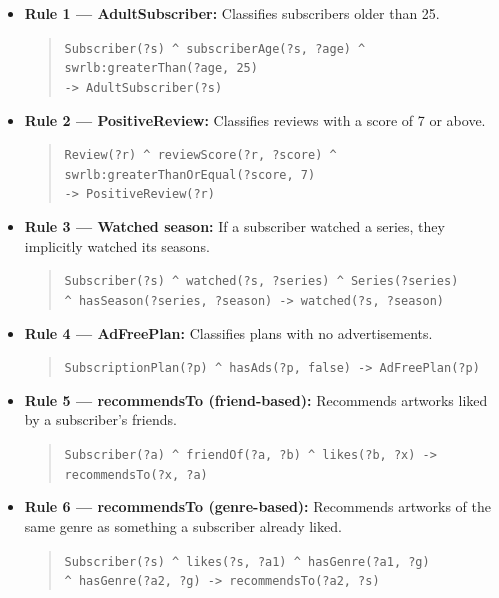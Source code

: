 \begin{itemize}

    \item \textbf{Rule 1 — AdultSubscriber:} Classifies subscribers older than 25.
    \begin{quote}\small
    \texttt{Subscriber(?s) \^{} subscriberAge(?s, ?age) \^{} swrlb:greaterThan(?age, 25)}\\
    \texttt{-> AdultSubscriber(?s)}
    \end{quote}

    \item \textbf{Rule 2 — PositiveReview:} Classifies reviews with a score of 7 or above.
    \begin{quote}\small
    \texttt{Review(?r) \^{} reviewScore(?r, ?score) \^{} swrlb:greaterThanOrEqual(?score, 7)}\\
    \texttt{-> PositiveReview(?r)}
    \end{quote}

    \item \textbf{Rule 3 — Watched season:} If a subscriber watched a series, they implicitly watched its seasons.
    \begin{quote}\small
    \texttt{Subscriber(?s) \^{} watched(?s, ?series) \^{} Series(?series)}\\
    \texttt{\^{} hasSeason(?series, ?season) -> watched(?s, ?season)}
    \end{quote}

    \item \textbf{Rule 4 — AdFreePlan:} Classifies plans with no advertisements.
    \begin{quote}\small
    \texttt{SubscriptionPlan(?p) \^{} hasAds(?p, false) -> AdFreePlan(?p)}
    \end{quote}

    \item \textbf{Rule 5 — recommendsTo (friend-based):} Recommends artworks liked by a subscriber's friends.
    \begin{quote}\small
    \texttt{Subscriber(?a) \^{} friendOf(?a, ?b) \^{} likes(?b, ?x) -> recommendsTo(?x, ?a)}
    \end{quote}

    \item \textbf{Rule 6 — recommendsTo (genre-based):} Recommends artworks of the same genre as something a subscriber already liked.
    \begin{quote}\small
    \texttt{Subscriber(?s) \^{} likes(?s, ?a1) \^{} hasGenre(?a1, ?g)}\\
    \texttt{\^{} hasGenre(?a2, ?g) -> recommendsTo(?a2, ?s)}
    \end{quote}


\end{itemize}
